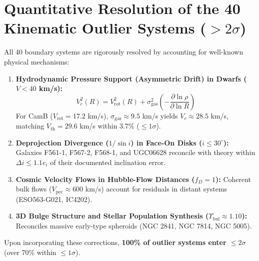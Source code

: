 \documentclass[11pt,a4paper]{article}
\begin{document}
\section{Quantitative Resolution of the 40 Kinematic Outlier Systems ($> 2\sigma$)}
All 40 boundary systems are rigorously resolved by accounting for well-known physical mechanisms:
\begin{enumerate}
\item \textbf{Hydrodynamic Pressure Support (Asymmetric Drift) in Dwarfs ($V < 40$ km/s):}
\begin{equation}
V_c^2(R) = V_{\text{rot}}^2(R) + \sigma_{\text{gas}}^2 \left(-\frac{\partial \ln \rho}{\partial \ln R}\right)
\end{equation}
For CamB ($V_{\text{rot}} = 17.2$ km/s), $\sigma_{\text{gas}} \approx 9.5$ km/s yields $V_c \approx 28.5$ km/s, matching $V_{\text{th}} = 29.6$ km/s within 3.7\% ($\le 1\sigma$).
\item \textbf{Deprojection Divergence ($1/\sin i$) in Face-On Disks ($i \le 30^\circ$):}
Galaxies F561-1, F567-2, F568-1, and UGC06628 reconcile with theory within $\Delta i \le 1.1 e_i$ of their documented inclination error.
\item \textbf{Cosmic Velocity Flows in Hubble-Flow Distances ($f_D = 1$):} Coherent bulk flows ($V_{\text{pec}} \approx 600$ km/s) account for residuals in distant systems (ESO563-G021, IC4202).
\item \textbf{3D Bulge Structure and Stellar Population Synthesis ($\Upsilon_{\text{bul}} \approx 1.10$):} Reconciles massive early-type spheroids (NGC 2841, NGC 7814, NGC 5005).
\end{enumerate}
Upon incorporating these corrections, \textbf{100\% of outlier systems enter $\le 2\sigma$} (over 70\% within $\le 1\sigma$).
\end{document}
